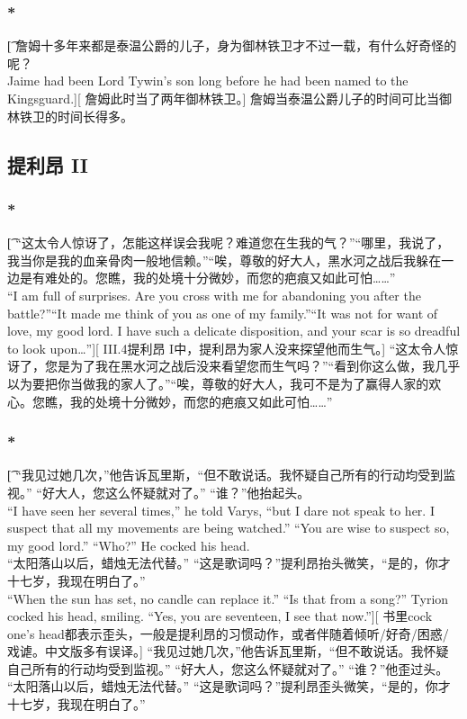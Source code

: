 \documentclass[12pt,a4paper]{article}
\begin{document}
\subsubsection{\color{red}*}\t[
	 詹姆十多年来都是泰温公爵的儿子，身为御林铁卫才不过一载，有什么好奇怪的呢？\\
	 Jaime had been Lord Tywin's son long before he had been named to the Kingsguard.][
	 詹姆此时当了两年御林铁卫。]
	 詹姆当泰温公爵儿子的时间可比当御林铁卫的时间长得多。
	 
\subsection{提利昂 II}
\subsubsection{\color{red}*}\t[
	“这太令人惊讶了，怎能这样误会我呢？难道您在生我的气？”“哪里，我说了，我当你是我的血亲骨肉一般地信赖。”“唉，尊敬的好大人，黑水河之战后我躲在一边是有难处的。您瞧，我的处境十分微妙，而您的疤痕又如此可怕……”\\
	“I am full of surprises. Are you cross with me for abandoning you after the battle?”“It made me think of you as one of my family.”“It was not for want of love, my good lord. I have such a delicate disposition, and your scar is so dreadful to look upon\ldots”][
	III.4提利昂 I中，提利昂为家人没来探望他而生气。]
	“这太令人惊讶了，您是为了我在黑水河之战后没来看望您而生气吗？”“看到你这么做，我几乎以为要把你当做我的家人了。”“唉，尊敬的好大人，我可不是为了赢得人家的欢心。您瞧，我的处境十分微妙，而您的疤痕又如此可怕……”
	
\subsubsection{\color{red}*}\t[	
	“我见过她几次，”他告诉瓦里斯，“但不敢说话。我怀疑自己所有的行动均受到监视。”
	“好大人，您这么怀疑就对了。”
	“谁？”他抬起头。\\
	“I have seen her several times,” he told Varys, “but I dare not speak to her. I suspect that all my movements are being watched.”
	“You are wise to suspect so, my good lord.”
	“Who?” He cocked his head.\\
	“太阳落山以后，蜡烛无法代替。”
	“这是歌词吗？”提利昂抬头微笑，“是的，你才十七岁，我现在明白了。”\\
	“When the sun has set, no candle can replace it.”
	“Is that from a song?” Tyrion cocked his head, smiling. “Yes, you are seventeen, I see that now.”][
	书里cock one's head都表示歪头，一般是提利昂的习惯动作，或者伴随着倾听/好奇/困惑/戏谑。中文版多有误译。]
	“我见过她几次，”他告诉瓦里斯，“但不敢说话。我怀疑自己所有的行动均受到监视。”
	“好大人，您这么怀疑就对了。”
	“谁？”他歪过头。\\
	“太阳落山以后，蜡烛无法代替。”
	“这是歌词吗？”提利昂歪头微笑，“是的，你才十七岁，我现在明白了。”
	
\end{document}
